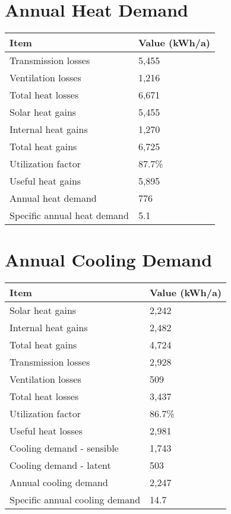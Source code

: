 \documentclass{article}
\begin{document}
\section*{Annual Heat Demand}

\begin{tabular}{@{}ll@{}}


\toprule
\textbf{Item} &
\textbf{Value (kWh/a)} \\
\midrule
Transmission losses & 5,455
\\
Ventilation losses & 1,216 \\
Total heat losses & 6,671 \\
Solar heat gains & 5,455 \\
Internal heat gains & 1,270 \\
Total heat gains & 6,725 \\
Utilization factor & 87.7\% \\
Useful heat gains & 5,895 \\
\midrule
Annual heat demand & 776 \\
Specific annual heat demand & 5.1 \\
\bottomrule
\end{tabular}

\vspace{1cm}
\section*{Annual Cooling Demand}
\begin{tabular}{@{}ll@{}}
\toprule
\textbf{Item} & \textbf{Value (kWh/a)} \\ \midrule
Solar heat gains & 2,242 \\
Internal heat gains & 2,482 \\
Total heat gains & 4,724 \\
Transmission losses & 2,928 \\
Ventilation losses & 509 \\
Total heat losses & 3,437 \\
Utilization factor & 86.7\% \\
Useful heat losses & 2,981 \\
\midrule
Cooling demand - sensible & 1,743 \\
Cooling demand - latent & 503 \\
Annual cooling demand & 2,247 \\
Specific annual cooling demand & 14.7 \\
\bottomrule
\end{tabular}
\end{document}
